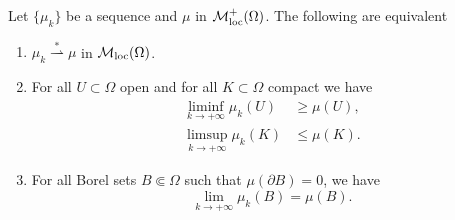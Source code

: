 \begin{theorem} \label{thm:criterion_weak_star_convergence}
Let $\{\mu_k\}$ be a sequence and $\mu$ in $\mathcal{M}^{+}_{\rm loc}(\Omega)$. The following are equivalent
\begin{enumerate}[(1)]
\item $\mu_k \stackrel {*}{\rightharpoonup} \mu$ in $\mathcal{M}_{\rm loc}(\Omega)$. 
\item For all $U \subset \Omega$ open and for all $K \subset \Omega$ compact we have 
\begin{align} \label{eq:liminf_ineq_open}
\liminf_{k\to + \infty} \mu_{k}(U) & \geq \mu(U), \\
\limsup_{k \to + \infty} \mu_{k}(K) & \leq \mu(K). \label{eq:limsup_ineq_compact}
\end{align} 
\item For all Borel sets $B\Subset \Omega$ such that $\mu(\partial B) = 0$, we
have 
\begin{equation} \label{eq:limit_Borel_no_boundary} 
\lim_{k \to + \infty} \mu_{k}(B) = \mu(B).
\end{equation}
\end{enumerate}
\end{theorem}

